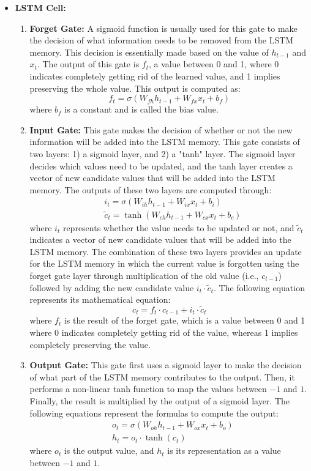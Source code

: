 \begin{enumerate}
\begin{itemize}
\item \textbf{LSTM Cell:}\\
 \begin{enumerate}
 \item \textbf{Forget Gate:}
A sigmoid function is usually used for this gate to make the decision of what information needs to be removed from the LSTM memory. This decision is essentially made based on the value of \(h_{t-1}\) and \(x_t\). The output of this gate is \(f_t\), a value between 0 and 1, where 0 indicates completely getting rid of the learned value, and 1 implies preserving the whole value. This output is computed as:
\[ f_t = \sigma(W_{fh}h_{t-1} + W_{fx}x_t + b_f) \]
where \(b_f\) is a constant and is called the bias value.

 \item \textbf{Input Gate:}
 This gate makes the decision of whether or not the new information will be added into the LSTM memory. This gate consists of two layers: 1) a sigmoid layer, and 2) a "tanh" layer. The sigmoid layer decides which values need to be updated, and the tanh layer creates a vector of new candidate values that will be added into the LSTM memory. The outputs of these two layers are computed through:
\begin{align*}
    & i_t = \sigma(W_{ih}h_{t-1} + W_{ix}x_t + b_i) \\
    & \tilde{c}_t = \tanh(W_{ch}h_{t-1} + W_{cx}x_t + b_c)
\end{align*}
where \(i_t\) represents whether the value needs to be updated or not, and \(\tilde{c}_t\) indicates a vector of new candidate values that will be added into the LSTM memory. The combination of these two layers provides an update for the LSTM memory in which the current value is forgotten using the forget gate layer through multiplication of the old value (i.e., \(c_{t-1}\)) followed by adding the new candidate value \(i_t \cdot \tilde{c}_t\). The following equation represents its mathematical equation:
\[ c_t = f_t \cdot c_{t-1} + i_t \cdot \tilde{c}_t  \]
where \(f_t\) is the result of the forget gate, which is a value between 0 and 1 where 0 indicates completely getting rid of the value, whereas 1 implies completely preserving the value.


\item \textbf{Output Gate:}
This gate first uses a sigmoid layer to make the decision of what part of the LSTM memory contributes to the output. Then, it performs a non-linear tanh function to map the values between $-1$ and $1$. Finally, the result is multiplied by the output of a sigmoid layer. The following equations represent the formulas to compute the output:
\begin{align*}
    & o_t = \sigma(W_{oh}h_{t-1} + W_{ox}x_t + b_o) \\
    & h_t = o_t \cdot \tanh(c_t) 
\end{align*}
where \(o_t\) is the output value, and \(h_t\) is its representation as a value between $-1$ and $1$.\\


\end{enumerate}
\end{itemize}
\end{enumerate}
